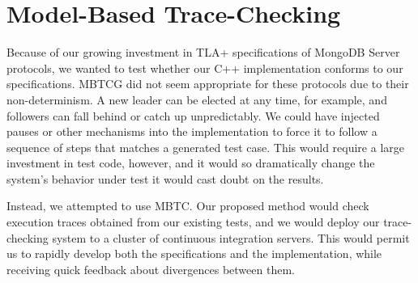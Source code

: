 \documentclass{vldb}
\begin{document}

\section{Model-Based Trace-Checking}
\label{sec:model_based_trace_checking}

Because of our growing investment in TLA+ specifications of MongoDB Server protocols, we wanted to test whether our C++ implementation conforms to our specifications.
MBTCG did not seem appropriate for these protocols due to their non-determinism. 
A new leader can be elected at any time, for example, and followers can fall behind or catch up unpredictably. 
We could have injected pauses or other mechanisms into the implementation to force it to follow a sequence of steps that matches a generated test case.
This would require a large investment in test code, however, and it would so dramatically change the system's behavior under test it would cast doubt on the results.

Instead, we attempted to use MBTC.
Our proposed method would check execution traces obtained from our existing tests, and we would deploy our trace-checking system to a cluster of continuous integration servers.
This would permit us to rapidly develop both the specifications and the implementation, while receiving quick feedback about divergences between them.


\end{document}
